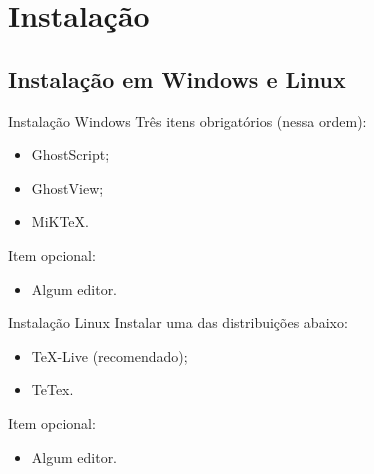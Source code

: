 \section{Instala{\c c}\~ao}

\subsection{Instala{\c c}\~ao em Windows e Linux}

\begin{frame}
 
\begin{block}{Instala{\c c}\~ao	Windows}
Tr\^es itens obrigatórios (nessa ordem):
\begin{itemize}
\item GhostScript;
\item GhostView;
\item MiK\TeX.
\end{itemize}
Item opcional:
\begin{itemize}
\item Algum editor.
\end{itemize}
\end{block}

\begin{block}{Instala{\c c}\~ao Linux}
Instalar uma das distribui{\c c}\~oes abaixo:
\begin{itemize}
\item TeX-Live (recomendado);
\item TeTex.
\end{itemize}
Item opcional:
\begin{itemize}
\item Algum editor.
\end{itemize}
\end{block}

\end{frame}



